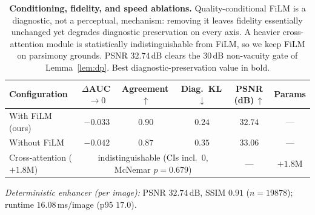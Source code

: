\begin{table}[!ht]
\centering
\caption{\textbf{Conditioning, fidelity, and speed ablations.}
Quality-conditional FiLM is a diagnostic, not a perceptual, mechanism: removing it leaves
fidelity essentially unchanged yet degrades diagnostic preservation on every axis. A heavier
cross-attention module is statistically indistinguishable from FiLM, so we keep FiLM on
parsimony grounds. PSNR $32.74$\,dB clears the $30$\,dB non-vacuity gate of
Lemma~\ref{lem:dp}. Best diagnostic-preservation value in bold.}
\label{tab:ablations}
\vspace{4pt}
\footnotesize
\setlength{\tabcolsep}{5pt}
\renewcommand{\arraystretch}{1.05}
\begin{tabular}{lccccc}
\toprule
Configuration & $\Delta$AUC\,$\to0$ & Agreement\,$\uparrow$ & Diag.\ KL\,$\downarrow$ & PSNR (dB)\,$\uparrow$ & Params \\
\midrule
\rowcolor{green!12}With FiLM (ours) & \cellcolor{green!18}$\mathbf{-0.033}$ & \cellcolor{green!18}$\mathbf{0.90}$ & \cellcolor{green!18}$\mathbf{0.24}$ & $32.74$ & --- \\
Without FiLM            & $-0.042$          & $0.87$          & $0.35$          & $\mathbf{33.06}$ & --- \\
Cross-attention ($+1.8$M) & \multicolumn{3}{c}{indistinguishable (CIs incl.\ 0, McNemar $p{=}0.679$)} & --- & $+1.8$M \\
\bottomrule
\end{tabular}
\vspace{2pt}
\footnotesize
\emph{Deterministic enhancer (per image):} PSNR $32.74$\,dB, SSIM $0.91$ ($n{=}19878$);
runtime $16.08$\,ms/image (p95 $17.0$).
\vspace{-4pt}
\end{table}
